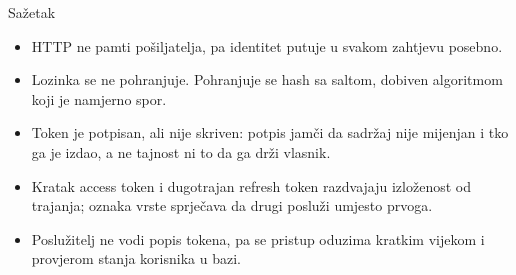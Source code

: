 \begin{frame}{Sažetak}
\begin{itemize}
  \item HTTP ne pamti pošiljatelja, pa identitet putuje u svakom zahtjevu posebno.
  \item Lozinka se ne pohranjuje. Pohranjuje se hash sa saltom, dobiven algoritmom koji je namjerno spor.
  \item Token je potpisan, ali nije skriven: potpis jamči da sadržaj nije mijenjan i tko ga je izdao, a ne tajnost ni to da ga drži vlasnik.
  \item Kratak access token i dugotrajan refresh token razdvajaju izloženost od trajanja; oznaka vrste sprječava da drugi posluži umjesto prvoga.
  \item Poslužitelj ne vodi popis tokena, pa se pristup oduzima kratkim vijekom i provjerom stanja korisnika u bazi.
\end{itemize}
\end{frame}


